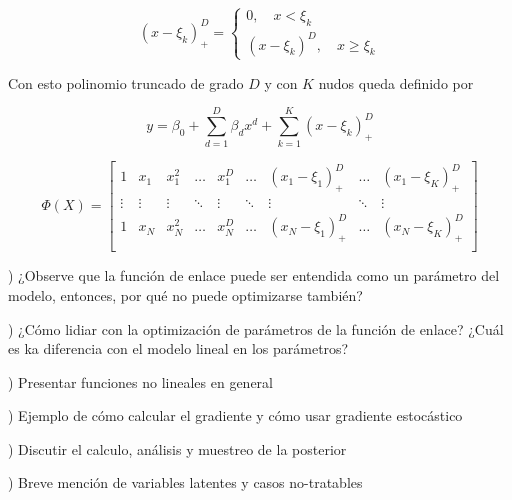 \begin{itemize}
    \begin{equation}
        (x-\xi_k)_+^D = \left\{\begin{matrix}
        0,\quad x < \xi_k\\
        (x-\xi_k)^D,\quad x \geq \xi_k
        \end{matrix}\right.
    \end{equation}
    
    Con esto polinomio truncado de grado $D$ y con $K$ nudos queda definido por
    
    \begin{equation}
        y = \beta_0 + \sum_{d=1}^D\beta_dx^d+\sum_{k=1}^K(x-\xi_k)_+^D
    \end{equation}
    
    \begin{equation}
        \Phi(X) = \left[ \begin{matrix} 1 & x_1 & x_1^2 & \ldots & x_1^D & \ldots & (x_1-\xi_1)_+^D & \ldots & (x_1-\xi_K)_+^D \\
        \vdots & \vdots & \vdots & \ddots & \vdots & \ddots & \vdots & \ddots & \vdots\\
        1 & x_N & x_N^2 & \ldots & x_N^D & \ldots & (x_N-\xi_1)_+^D & \ldots & (x_N-\xi_K)_+^D \\
        \end{matrix} \right]
    \end{equation}
    
\end{itemize}




\begin{mdframed}[style=discusion, frametitle={\center Observaciones}]

) ¿Observe que la función de enlace puede ser entendida como un parámetro del modelo, entonces, por qué no puede optimizarse también?

) ¿Cómo lidiar con la optimización de parámetros de la función de enlace? ¿Cuál es ka diferencia con el modelo lineal en los parámetros?

\end{mdframed}


\begin{mdframed}[style=pendiente, frametitle={\center Nueva subsección}]

) Presentar funciones no lineales en general

) Ejemplo de cómo calcular el gradiente y cómo usar gradiente estocástico

) Discutir el calculo, análisis y muestreo de la posterior 

) Breve mención de variables latentes y casos no-tratables 


\end{mdframed}




